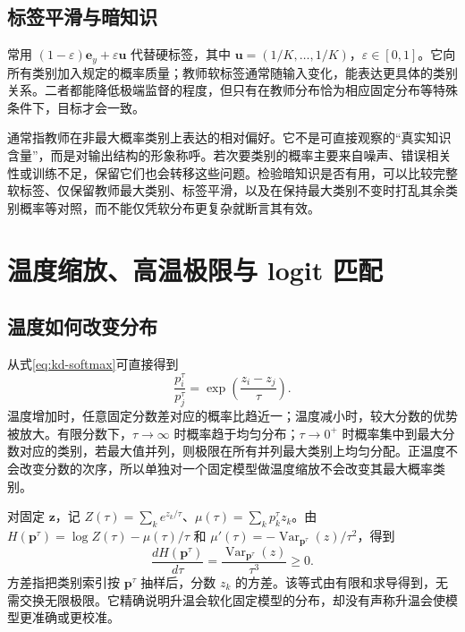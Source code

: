 \documentclass[UTF8,12pt,a4paper,fontset=fandol]{ctexart}
\begin{document}
\subsection{标签平滑与暗知识}
常用 $(1-\varepsilon)\mathbf e_y+\varepsilon\mathbf u$ 代替硬标签，其中 $\mathbf u=(1/K,\ldots,1/K)$，$\varepsilon\in[0,1]$。它向所有类别加入规定的概率质量；教师软标签通常随输入变化，能表达更具体的类别关系。二者都能降低极端监督的程度，但只有在教师分布恰为相应固定分布等特殊条件下，目标才会一致。

通常指教师在非最大概率类别上表达的相对偏好。它不是可直接观察的“真实知识含量”，而是对输出结构的形象称呼。若次要类别的概率主要来自噪声、错误相关性或训练不足，保留它们也会转移这些问题。检验暗知识是否有用，可以比较完整软标签、仅保留教师最大类别、标签平滑，以及在保持最大类别不变时打乱其余类别概率等对照，而不能仅凭软分布更复杂就断言其有效。

\section{温度缩放、高温极限与 logit 匹配}
\label{sec:kd-temperature}

\subsection{温度如何改变分布}
从式\eqref{eq:kd-softmax}可直接得到
\begin{equation}
 \frac{p_i^\tau}{p_j^\tau}=\exp\left(\frac{z_i-z_j}{\tau}\right).
 \label{eq:kd-odds}
\end{equation}
温度增加时，任意固定分数差对应的概率比趋近一；温度减小时，较大分数的优势被放大。有限分数下，$\tau\to\infty$ 时概率趋于均匀分布；$\tau\to0^+$ 时概率集中到最大分数对应的类别，若最大值并列，则极限在所有并列最大类别上均匀分配。正温度不会改变分数的次序，所以单独对一个固定模型做温度缩放不会改变其最大概率类别。

对固定 $\mathbf z$，记 $Z(\tau)=\sum_ke^{z_k/\tau}$、$\mu(\tau)=\sum_kp_k^\tau z_k$。由 $H(\mathbf p^\tau)=\log Z(\tau)-\mu(\tau)/\tau$ 和 $\mu'(\tau)=-\operatorname{Var}_{\mathbf p^\tau}(z)/\tau^2$，得到
\begin{equation}
 \frac{dH(\mathbf p^\tau)}{d\tau}
 =\frac{\operatorname{Var}_{\mathbf p^\tau}(z)}{\tau^3}\geq0.
 \label{eq:kd-entropy-temperature}
\end{equation}
方差指把类别索引按 $\mathbf p^\tau$ 抽样后，分数 $z_k$ 的方差。该等式由有限和求导得到，无需交换无限极限。它精确说明升温会软化固定模型的分布，却没有声称升温会使模型更准确或更校准。
\end{document}
